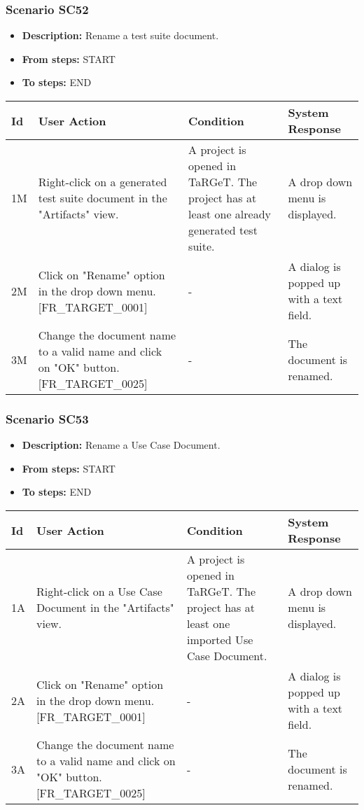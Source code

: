 \documentclass[a4paper,11pt]{article}
\newcommand{\bl}{\\ \hline}
\begin{document}
\subsubsection*{Scenario SC52}
\begin{itemize}
\item {\bf Description:} Rename a test suite document.
\item {\bf From steps:} START
\item {\bf To steps:} END
\end{itemize}
\begin{tabular}{|p{0.4in}|p{1.5in}|p{1.5in}|p{1.5in}|}
\hline
Id & User Action & Condition & System Response \bl 
1M & Right-click on a generated test suite document in the
						"Artifacts" view.  & A project is opened in TaRGeT. The project has at least
						one already generated test suite. & A drop down menu is displayed.\bl
2M & Click on "Rename" option in the drop down menu.
						[FR_TARGET_0001] & - & A dialog is popped up with a text field.\bl
3M & Change the document name to a valid name and click on "OK"
						button. [FR_TARGET_0025] & - & The document is renamed.\bl
\end{tabular}
\subsubsection*{Scenario SC53}
\begin{itemize}
\item {\bf Description:} Rename a Use Case Document.
\item {\bf From steps:} START
\item {\bf To steps:} END
\end{itemize}
\begin{tabular}{|p{0.4in}|p{1.5in}|p{1.5in}|p{1.5in}|}
\hline
Id & User Action & Condition & System Response \bl 
1A & Right-click on a Use Case Document in the "Artifacts" view.
					 & A project is opened in TaRGeT. The project has at least
						one imported Use Case Document. & A drop down menu is displayed.\bl
2A & Click on "Rename" option in the drop down menu.
						[FR_TARGET_0001] & - & A dialog is popped up with a text field.\bl
3A & Change the document name to a valid name and click on "OK"
						button. [FR_TARGET_0025] & - & The document is renamed.\bl
\end{tabular}
\end{document}

